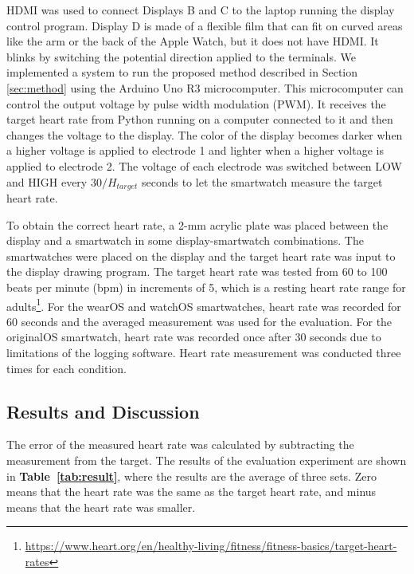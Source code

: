 \documentclass[sigconf]{acmart}
\newcommand\tabref[1]{\textbf{Table~\ref{tab:#1}}}
\begin{document}
HDMI was used to connect Displays B and C to the laptop running the display control program. Display D is made of a flexible film that can fit on curved areas like the arm or the back of the Apple Watch, but it does not have HDMI. It blinks by switching the potential direction applied to the terminals. We implemented a system to run the proposed method described in Section \ref{sec:method} using the Arduino Uno R3 microcomputer. This microcomputer can control the output voltage by pulse width modulation (PWM). It receives the target heart rate from Python running on a computer connected to it and then changes the voltage to the display. The color of the display becomes darker when a higher voltage is applied to electrode 1 and lighter when a higher voltage is applied to electrode 2. The voltage of each electrode was switched between LOW and HIGH every $30/H_{target}$ seconds to let the smartwatch measure the target heart rate.\par

To obtain the correct heart rate, a 2-mm acrylic plate was placed between the display and a smartwatch in some display-smartwatch combinations. The smartwatches were placed on the display and the target heart rate was input to the display drawing program. The target heart rate was tested from 60 to 100 beats per minute (bpm) in increments of 5, which is a resting heart rate range for adults\footnote{\url{https://www.heart.org/en/healthy-living/fitness/fitness-basics/target-heart-rates}}. For the wearOS and watchOS smartwatches, heart rate was recorded for 60 seconds and the averaged measurement was used for the evaluation. For the originalOS smartwatch, heart rate was recorded once after 30 seconds due to limitations of the logging software. Heart rate measurement was conducted three times for each condition.


\subsection{Results and Discussion}
The error of the measured heart rate was calculated by subtracting the measurement from the target.
The results of the evaluation experiment are shown in \tabref{result}, where the results are the average of three sets.
Zero means that the heart rate was the same as the target heart rate, and minus means that the heart rate was smaller.
\end{document}
